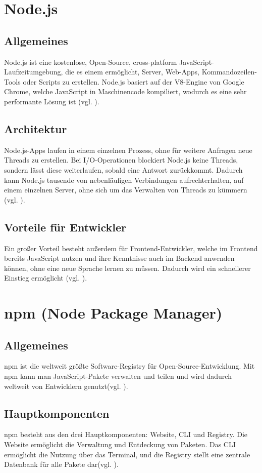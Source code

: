 \documentclass[oneside]{ausarbeitung}
\begin{document}
\section{Node.js}
\subsection{Allgemeines}
Node.js ist eine kostenlose, Open-Source, cross-platform JavaScript-Laufzeitumgebung, die es einem ermöglicht, Server, Web-Apps, Kommandozeilen-Tools oder Scripts zu erstellen. Node.js basiert auf der V8-Engine von Google Chrome, welche JavaScript in Maschinencode kompiliert, wodurch es eine sehr performante Lösung ist (vgl. \parencite{nodejs}).

\subsection{Architektur}
Node.js-Apps laufen in einem einzelnen Prozess, ohne für weitere Anfragen neue Threads zu erstellen. Bei I/O-Operationen blockiert Node.js keine Threads, sondern lässt diese weiterlaufen, sobald eine Antwort zurückkommt. Dadurch kann Node.js tausende von nebenläufigen Verbindungen aufrechterhalten, auf einem einzelnen Server, ohne sich um das Verwalten von Threads zu kümmern (vgl. \parencite{nodejs}).

\subsection{Vorteile für Entwickler}
Ein großer Vorteil besteht außerdem für Frontend-Entwickler, welche im Frontend bereits JavaScript nutzen und ihre Kenntnisse auch im Backend anwenden können, ohne eine neue Sprache lernen zu müssen. Dadurch wird ein schnellerer Einstieg ermöglicht (vgl. \parencite{nodejs}).

\section{npm (Node Package Manager)}
\subsection{Allgemeines}
npm ist die weltweit größte Software-Registry für Open-Source-Entwicklung. Mit npm kann man JavaScript-Pakete verwalten und teilen und wird dadurch weltweit von Entwicklern genutzt(vgl. \parencite{npm}). 

\subsection{Hauptkomponenten}
npm besteht aus den drei Hauptkomponenten: Website, CLI und Registry. Die Website ermöglicht die Verwaltung und Entdeckung von Paketen. Das CLI ermöglicht die Nutzung über das Terminal, und die Registry stellt eine zentrale Datenbank für alle Pakete dar(vgl. \parencite{npm}).
\end{document}

